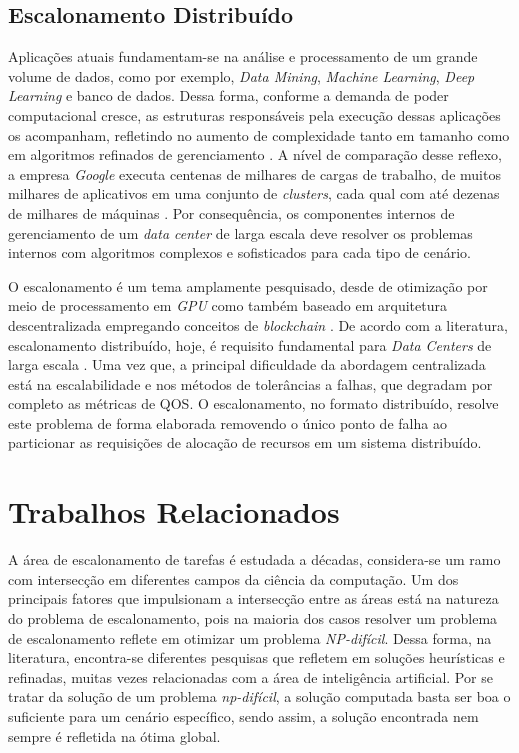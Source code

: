 \subsection{Escalonamento Distribuído}

Aplicações atuais fundamentam-se na análise e processamento de um grande volume de dados, como por exemplo, \textit{Data Mining}, \textit{Machine Learning}, \textit{Deep Learning} e banco de dados. Dessa forma, conforme a demanda de poder computacional cresce, as estruturas responsáveis pela execução dessas aplicações os acompanham, refletindo no aumento de complexidade tanto em tamanho como em algoritmos refinados de gerenciamento \cite{Wang2016LoadbalancedAL}. A nível de comparação desse reflexo, a empresa \textit{Google} executa centenas de milhares de cargas de trabalho, de muitos milhares de aplicativos em uma conjunto de \textit{clusters}, cada qual com até dezenas de milhares de máquinas \cite{Google2015Borg}. Por consequência, os componentes internos de gerenciamento de um \textit{data center} de larga escala deve resolver os problemas internos com algoritmos complexos e sofisticados para cada tipo de cenário.

O escalonamento é um tema amplamente pesquisado, desde de otimização por meio de processamento em \textit{GPU} \cite{Nesi2018ScheduleGPU} como também baseado em arquitetura descentralizada empregando conceitos de \textit{blockchain} \cite{loch2021novel}. De acordo com a literatura, escalonamento distribuído, hoje, é requisito fundamental para \textit{Data Centers} de larga escala \cite{Google2015Borg, Wang2019Pigeon}. Uma vez que, a principal dificuldade da abordagem centralizada está na escalabilidade e nos métodos de tolerâncias a falhas, que degradam por completo as métricas de \ac{QOS}. O escalonamento, no formato distribuído, resolve este problema de forma elaborada removendo o único ponto de falha ao particionar as requisições de alocação de recursos em um sistema distribuído.

\section{Trabalhos Relacionados}

A área de escalonamento de tarefas é estudada a décadas, considera-se um ramo com intersecção em diferentes campos da ciência da computação. Um dos principais fatores que impulsionam a intersecção entre as áreas está na natureza do problema de escalonamento, pois na maioria dos casos resolver um problema de escalonamento reflete em otimizar um problema \textit{NP-difícil}. Dessa forma, na literatura, encontra-se diferentes pesquisas que refletem em soluções heurísticas e refinadas, muitas vezes relacionadas com a área de inteligência artificial. Por se tratar da solução de um problema \textit{np-difícil}, a solução computada basta ser boa o suficiente para um cenário específico, sendo assim, a solução encontrada nem sempre é refletida na ótima global.


